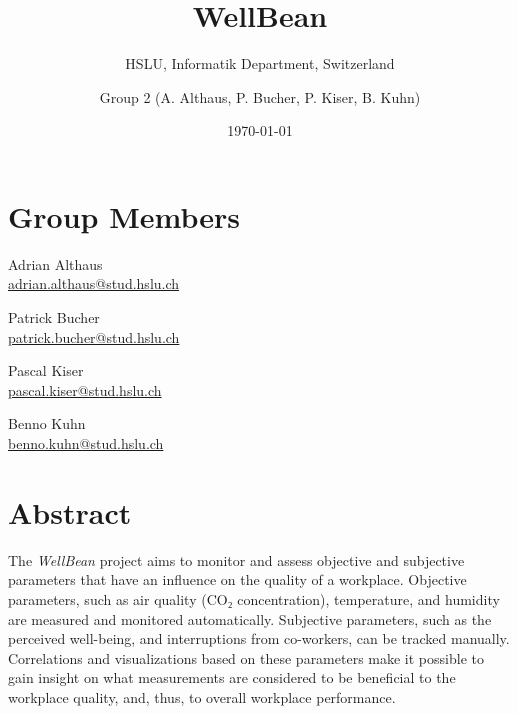 
\author{Group 2 (A. Althaus, P. Bucher, P. Kiser, B. Kuhn)}
\title{ \vspace{-2cm}WellBean}
\subtitle{HSLU, Informatik Department, Switzerland}
\date{\today}
\maketitle

\section*{Group Members}

\begin{multicols}{2}
\noindent
Adrian Althaus\\ \href{mailto:adrian.althaus@stud.hslu.ch}{adrian.althaus@stud.hslu.ch}

\noindent
Patrick Bucher\\ \href{mailto:patrick.bucher@stud.hslu.ch}{patrick.bucher@stud.hslu.ch}

\noindent
Pascal Kiser\\ \href{mailto:pascal.kiser@stud.hslu.ch}{pascal.kiser@stud.hslu.ch}

\noindent
Benno Kuhn\\ \href{mailto:benno.kuhn@stud.hslu.ch}{benno.kuhn@stud.hslu.ch}
\end{multicols}
\enlargethispage{1cm}
\renewcommand{\baselinestretch}{1.05}\normalsize
\tableofcontents
\renewcommand{\baselinestretch}{1.25}\normalsize

\section{Abstract}
The \textit{WellBean} project aims to monitor and assess objective and
subjective parameters that have an influence on the quality of a workplace.
Objective parameters, such as air quality (CO₂ concentration), temperature, and
humidity are measured and monitored automatically. Subjective parameters, such
as the perceived well-being, and interruptions from co-workers, can be tracked
manually. Correlations and visualizations based on these parameters make it
possible to gain insight on what measurements are considered to be beneficial
to the workplace quality, and, thus, to overall workplace performance.
